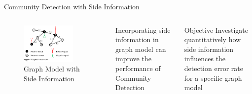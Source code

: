\documentclass{beamer}
\begin{document}
\begin{frame}{Community Detection with Side Information}
	\begin{columns}
	\begin{figure}
		\includegraphics[width=0.8\textwidth]{si.png}
		\caption{\scriptsize Graph Model with Side Information}
	\end{figure}
	Incorporating side information in graph model
	can improve the performance of Community Detection
	\begin{block}{Objective}
		Investigate quantitatively how side information influences
		the detection error rate for a specific graph model
	\end{block}
	\end{columns}
\end{frame}
\end{document}
